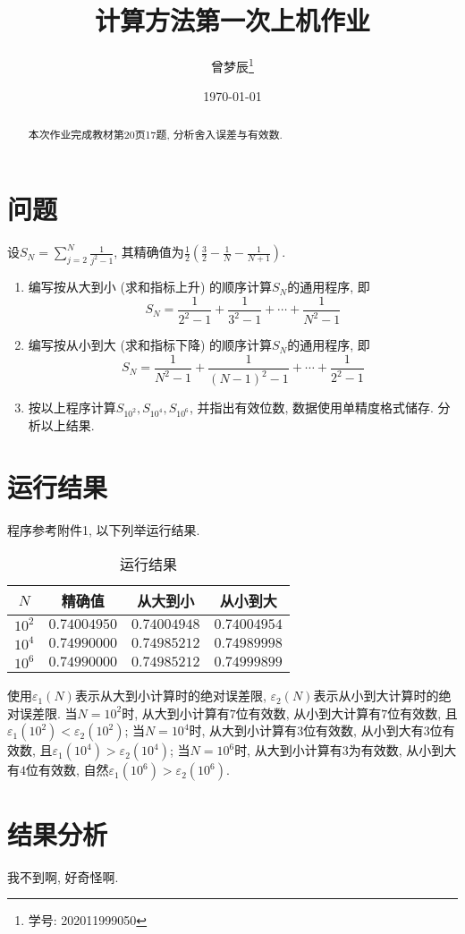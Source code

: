 \documentclass{ctexart}
\title{计算方法第一次上机作业}
\author{曾梦辰\thanks{学号: 202011999050}}
\date{\today}
\begin{document}
\maketitle
\begin{abstract}
    本次作业完成教材第20页17题, 分析舍入误差与有效数.
\end{abstract}

\section{问题}
设$\displaystyle S_N=\sum_{j=2}^N\frac{1}{j^2-1}$, 其精确值为$\displaystyle\frac{1}{2}\left(\frac{3}{2}-\frac{1}{N}-\frac{1}{N+1}\right)$.
\begin{enumerate}[(1)]
    \item 编写按从大到小 (求和指标上升) 的顺序计算$S_N$的通用程序, 即
    \[S_N=\frac{1}{2^2-1}+\frac{1}{3^2-1}+\cdots+\frac{1}{N^2-1}\]
    \item 编写按从小到大 (求和指标下降) 的顺序计算$S_N$的通用程序, 即
    \[S_N=\frac{1}{N^2-1}+\frac{1}{(N-1)^2-1}+\cdots+\frac{1}{2^2-1}\]
    \item 按以上程序计算$S_{10^2},S_{10^4},S_{10^6}$, 并指出有效位数, 数据使用单精度格式储存.
    分析以上结果.
\end{enumerate}

\section{运行结果}
程序参考附件1, 以下列举运行结果.
\begin{table}[H]
    \centering
    \begin{tabular}{|c|c|c|c|}
    \hline
    $N$    & 精确值        & 从大到小         & 从小到大         \\ \hline
    $10^2$ & $0.74004950$ & $0.74004948$   & $0.74004954$   \\ \hline
    $10^4$ & $0.74990000$ & $0.74985212$   & $0.74989998$   \\ \hline
    $10^6$ & $0.74990000$ & $0.74985212$   & $0.74999899$   \\ \hline
    \end{tabular}
    \caption{运行结果}
\end{table}

使用$\varepsilon_1(N)$表示从大到小计算时的绝对误差限, $\varepsilon_2(N)$表示从小到大计算时的绝对误差限.
当$N=10^2$时, 从大到小计算有$7$位有效数, 从小到大计算有$7$位有效数, 且$\varepsilon_1(10^2)<\varepsilon_2(10^2)$;
当$N=10^4$时, 从大到小计算有$3$位有效数, 从小到大有$3$位有效数, 且$\varepsilon_1(10^4)>\varepsilon_2(10^4)$;
当$N=10^6$时, 从大到小计算有$3$为有效数, 从小到大有$4$位有效数, 自然$\varepsilon_1(10^6)>\varepsilon_2(10^6)$.

\section{结果分析}
我不到啊, 好奇怪啊.
\end{document}
